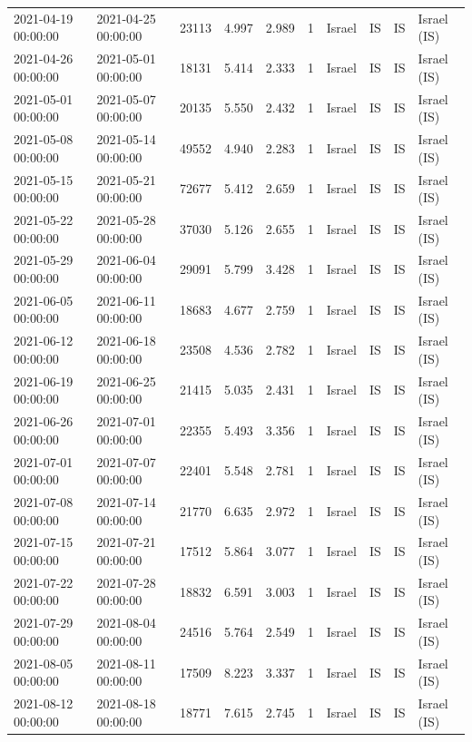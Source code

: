 \begin{tabular}{llrrrlllll}
2021-04-19 00:00:00 & 2021-04-25 00:00:00 & 23113 & 4.997 & 2.989 & 1 & Israel & IS & IS & Israel (IS) \\
2021-04-26 00:00:00 & 2021-05-01 00:00:00 & 18131 & 5.414 & 2.333 & 1 & Israel & IS & IS & Israel (IS) \\
2021-05-01 00:00:00 & 2021-05-07 00:00:00 & 20135 & 5.550 & 2.432 & 1 & Israel & IS & IS & Israel (IS) \\
2021-05-08 00:00:00 & 2021-05-14 00:00:00 & 49552 & 4.940 & 2.283 & 1 & Israel & IS & IS & Israel (IS) \\
2021-05-15 00:00:00 & 2021-05-21 00:00:00 & 72677 & 5.412 & 2.659 & 1 & Israel & IS & IS & Israel (IS) \\
2021-05-22 00:00:00 & 2021-05-28 00:00:00 & 37030 & 5.126 & 2.655 & 1 & Israel & IS & IS & Israel (IS) \\
2021-05-29 00:00:00 & 2021-06-04 00:00:00 & 29091 & 5.799 & 3.428 & 1 & Israel & IS & IS & Israel (IS) \\
2021-06-05 00:00:00 & 2021-06-11 00:00:00 & 18683 & 4.677 & 2.759 & 1 & Israel & IS & IS & Israel (IS) \\
2021-06-12 00:00:00 & 2021-06-18 00:00:00 & 23508 & 4.536 & 2.782 & 1 & Israel & IS & IS & Israel (IS) \\
2021-06-19 00:00:00 & 2021-06-25 00:00:00 & 21415 & 5.035 & 2.431 & 1 & Israel & IS & IS & Israel (IS) \\
2021-06-26 00:00:00 & 2021-07-01 00:00:00 & 22355 & 5.493 & 3.356 & 1 & Israel & IS & IS & Israel (IS) \\
2021-07-01 00:00:00 & 2021-07-07 00:00:00 & 22401 & 5.548 & 2.781 & 1 & Israel & IS & IS & Israel (IS) \\
2021-07-08 00:00:00 & 2021-07-14 00:00:00 & 21770 & 6.635 & 2.972 & 1 & Israel & IS & IS & Israel (IS) \\
2021-07-15 00:00:00 & 2021-07-21 00:00:00 & 17512 & 5.864 & 3.077 & 1 & Israel & IS & IS & Israel (IS) \\
2021-07-22 00:00:00 & 2021-07-28 00:00:00 & 18832 & 6.591 & 3.003 & 1 & Israel & IS & IS & Israel (IS) \\
2021-07-29 00:00:00 & 2021-08-04 00:00:00 & 24516 & 5.764 & 2.549 & 1 & Israel & IS & IS & Israel (IS) \\
2021-08-05 00:00:00 & 2021-08-11 00:00:00 & 17509 & 8.223 & 3.337 & 1 & Israel & IS & IS & Israel (IS) \\
2021-08-12 00:00:00 & 2021-08-18 00:00:00 & 18771 & 7.615 & 2.745 & 1 & Israel & IS & IS & Israel (IS) \\

\end{tabular}

